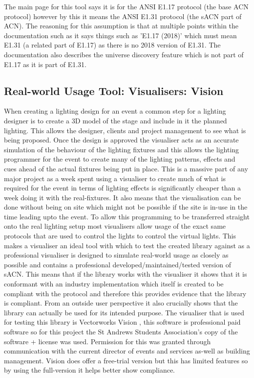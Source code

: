 \documentclass[11pt,a4paper]{report}
\begin{document}
The main page for this tool says it is for the ANSI E1.17 \cite{ANSI_E1.17} protocol (the base ACN protocol) however by this it means the ANSI E1.31 protocol (the sACN part of ACN). The reasoning for this assumption is that at multiple points within the documentation such as \cite{SACN_VIEWER_DOC} it says things such as 'E1.17 (2018)' which must mean E1.31 (a related part of E1.17) as there is no 2018 version of E1.31. The documentation also describes the universe discovery feature which is not part of E1.17 as it is part of E1.31.

\subsection{Real-world Usage Tool: Visualisers: Vision}
When creating a lighting design for an event a common step for a lighting designer is to create a 3D model of the stage and include in it the planned lighting. This allows the designer, clients and project management to see what is being proposed. Once the design is approved the visualiser acts as an accurate simulation of the behaviour of the lighting fixtures and this allows the lighting programmer for the event to create many of the lighting patterns, effects and cues ahead of the actual fixtures being put in place. This is a massive part of any major project as a week spent using a visualiser to create much of what is required for the event in terms of lighting effects is significantly cheaper than a week doing it with the real-fixtures. It also means that the visualisation can be done without being on site which might not be possible if the site is in-use in the time leading upto the event. To allow this programming to be transferred straight onto the real lighting setup most visualisers allow usage of the exact same protocols that are used to control the lights to control the virtual lights. This makes a visualiser an ideal tool with which to test the created library against as a professional visualiser is designed to simulate real-world usage as closely as possible and contains a professional developed/maintained/tested version of sACN. This means that if the library works with the visualiser it shows that it is conformant with an industry implementation which itself is created to be compliant with the protocol and therefore this provides evidence that the library is compliant. From an outside user perspective it also crucially shows that the library can actually be used for its intended purpose. The visualiser that is used for testing this library is Vectorworks Vision \cite{VISION}, this software is professional paid software so for this project the St Andrews Students Association's copy of the software + license was used. Permission for this was granted through communication with the current director of events and services as-well as building management. Vision does offer a free-trial version but this has limited features so by using the full-version it helps better show compliance. \\
\end{document}
